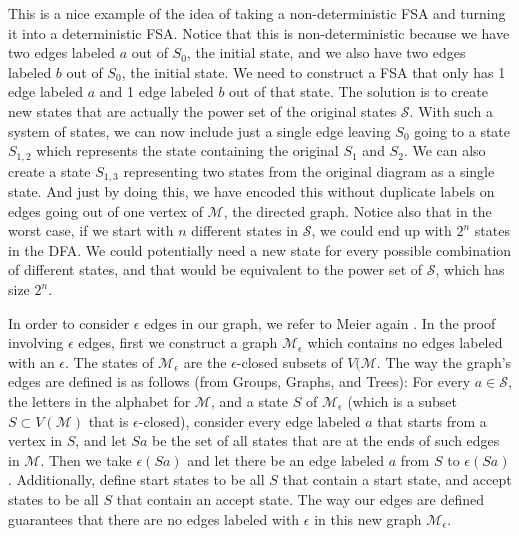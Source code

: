 \documentclass[12pt]{amsart}
\begin{document}
This is a nice example of the idea of taking a non-deterministic FSA and turning it into a deterministic FSA. Notice that this is non-deterministic because we have two edges labeled $a$ out of $S_0$, the initial state, and we also have two edges labeled $b$ out of $S_0$, the initial state. We need to construct a FSA that only has 1 edge labeled $a$ and 1 edge labeled $b$ out of that state. The solution is to create new states that are actually the power set of the original states $\mathcal{S}$. With such a system of states, we can now include just a single edge leaving $S_0$ going to a state $S_{1,2}$ which represents the state containing the original $S_1$ and $S_2$. We can also create a state $S_{1,3}$ representing two states from the original diagram as a single state. And just by doing this, we have encoded this without duplicate labels on edges going out of one vertex of $\mathcal{M}$, the directed graph. Notice also that in the worst case, if we start with $n$ different states in $\mathcal{S}$, we could end up with $2^n$ states in the DFA. We could potentially need a new state for every possible combination of different states, and that would be equivalent to the power set of $\mathcal{S}$, which has size $2^n$. 


\begin{center}
\end{center}

In order to consider $\epsilon$ edges in our graph, we refer to Meier again \cite{ggt}. In the proof involving $\epsilon$ edges, first we construct a graph $\mathcal{M}_\epsilon$ which contains no edges labeled with an $\epsilon$. The states of $\mathcal{M}_\epsilon$ are the $\epsilon$-closed subsets of $V(\mathcal{M}$. The way the graph's edges are defined is as follows (from Groups, Graphs, and Trees)\cite{ggt}: For every $a\in \mathcal{S}$, the letters in the alphabet for $\mathcal{M}$, and a state $S$ of $\mathcal{M}_\epsilon$ (which is a subset $S\subset V(\mathcal{M})$ that is $\epsilon$-closed), consider every edge labeled $a$ that starts from a vertex in $S$, and let $Sa$ be the set of all states that are at the ends of such edges in $\mathcal{M}$. Then we take $\epsilon(Sa)$ and let there be an edge labeled $a$ from $S$ to $\epsilon(Sa)$. Additionally, define start states to be all $S$ that contain a start state, and accept states to be all $S$ that contain an accept state. The way our edges are defined guarantees that there are no edges labeled with $\epsilon$ in this new graph $\mathcal{M}_\epsilon$. 
\end{document}
